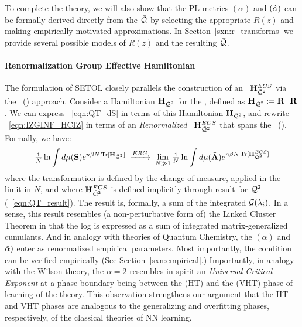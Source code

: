 To complete the theory, we
will also show that the \HTSR PL \LayerQuality metrics \ALPHA $(\alpha)$  and \ALPHAHAT $(\hat\alpha)$
can be formally derived directly from the \SETOL \LayerQuality $\bar{\mathcal{Q}}$ by selecting the appropriate
\RTransform $R(z)$ and making empirically motivated approximations. In Section~\ref{sxn:r_transforms} we provide several possible
models of $R(z)$ and the resulting \LayerQuality $\bar{\mathcal{Q}}$.

\paragraph{Renormalization Group Effective Hamiltonian}
The formulation of SETOL closely parallels the construction of an \EffectiveHamiltonian~$\mathbf{H}^{ECS}_{\bar{\mathcal{Q}}^{2}}$
via the \WilsonExactRenormalizationGroup~(\ERG) approach. Consider a \emph{\Bare} Hamiltonian $\mathbf{H}_{\bar{\mathcal{Q}}^{2}}$ for the \LayerQualitySquared,
defined as $\mathbf{H}_{\bar{\mathcal{Q}}^{2}}:= \mathbf{R}^{\top}\mathbf{R}$.
We can express \EQN~\ref{eqn:QT_dS} in terms of this \Bare Hamiltonian $\mathbf{H}_{\bar{\mathcal{Q}}^{2}}$,
and rewrite \EQN~\ref{eqn:IZGINF_HCIZ} in terms of an \emph{Renormalized} \EffectiveHamiltonian~$\mathbf{H}^{ECS}_{\bar{\mathcal{Q}}^{2}}$
that spans the \EffectiveCorrelationSpace~(\ECS). Formally, we have:
\begin{align}
\label{eqn:RG}
\tfrac{1}{N}\ln \int d\mu({\mathbf{S}})e^{n \beta N \operatorname{Tr}[\mathbf{H}_{\bar{\mathcal{Q}}^{2}}]} \;\xrightarrow{ERG}\; \lim_{N\gg 1}\tfrac{1}{N}\ln \int d\mu(\tilde{\mathbf{A}})e^{n \beta N \operatorname{Tr}[\mathbf{H}^{ECS}_{\bar{\mathcal{Q}}^{2}}]} 
\end{align}
where the \ERG transformation is defined by the \ScaleInvariant change of measure,
applied in the \WideLayer \LargeN limit in $N$,
and where $\mathbf{H}^{ECS}_{\bar{\mathcal{Q}}^{2}}$ is defined implicitly through result for $\bar{\mathcal{Q}}^{2}$ (\EQN~\ref{eqn:QT_result}).
The result is, formally, a sum of the integrated \RTransforms $\mathcal{G}(\lambda_{i})$.
In a sense, this result resembles (a non-perturbative form of) the Linked Cluster Theorem
in that the log \PartitionFunction is expressed as a sum of integrated matrix-generalized cumulants.  And in analogy with \SemiEmpirical theories of Quantum Chemistry, the \HTSR \ALPHA $(\alpha)$ and \ALPHAHAT $\hat\alpha)$ enter as renormalized empirical parameters.
Most importantly, the \ScaleInvariant \TRACELOG condition can be verified empirically (See Section~\ref{sxn:empirical}.)
Importantly, in analogy with the Wilson \ExactRenormalizationGroup theory, 
the \HTSR $\alpha=2$ resembles in spirit
an \ERG \emph{Universal Critical Exponent} at a phase boundary being between the \HeavyTailed 
(HT) and the \VeryHeavyTailed (VHT) phase of learning of the \HTSR theory.
This observation strengthens our argument that the \HTSR HT and VHT phases
are analogous to the generalizing and overfitting phases, respectively,
of the classical \SMOG theories of NN learning.


